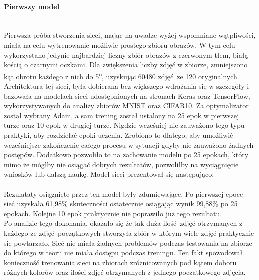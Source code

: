 \paragraph{Pierwszy model} \mbox{}\\
Pierwsza próba stworzenia sieci, mając na uwadze wyżej wspomniane wątpliwości, miała
na celu wytrenowanie możliwie prostego zbioru obrazów. W tym celu wykorzystano jedynie
najbardziej liczny zbiór obrazów z czerwonym tłem, białą kością o czarnymi oczkami. Dla
zwiększenia liczby zdjęć w zbiorze, zmniejszono kąt obrotu każdego z nich do
5\textsuperscript{o}, uzyskując 60480 zdjęć ze 120 oryginalnych.\\
Architektura tej sieci, była dobierana bez większego wdrażania się w szczegóły i
bazowała na modelach sieci udostępnionych na stronach Keras oraz TensorFlow,
wykorzystywanych do analizy zbiorów MNIST oraz CIFAR10. Za optymalizator został wybrany
Adam, a sam trening został ustalony na 25 epok w pierwszej turze oraz 10 epok w drugiej
turze. Nigdzie wcześniej nie zauważono tego typu praktyki, aby rozdzielać epoki uczenia.
Zrobiono to dlatego, aby umożliwić wcześniejsze zakończenie całego procesu w sytuacji
gdyby nie zauważono żadnych postępów. Dodatkowo pozwoliło to na zachowanie modelu
po 25 epokach, który mimo że mógłby nie osiągać dobrych rezultatów, pozwoliłby
na wyciągnięcie wniosków lub dalszą naukę. Model sieci prezentował się następująco:\\\\
Rezulataty osiągnięte przez ten model były zdumiewające. Po pierwszej epoce
sieć uzyskała 61,98\% skuteczności ostatecznie osiągając wynik 99,88\% po 25 epokach.
Kolejne 10 epok praktycznie nie poprawiło już tego rezultatu.\\
Po analizie tego dokonania, okazało się że tak duża ilość zdjęć otrzymanych
z każdego ze zdjęć początkowych stworzyła zbiór w którym wiele zdjęć praktycznie się
powtarzało. Sieć nie miała żadnych problemów podczas testowania na zbiorze
do którego w teorii nie miała dostępu podczas treningu. Ten fakt spowodował konieczność
trenowania sieci na zbiorach zróżnicowanych pod kątem doboru różnych kolorów oraz
ilości zdjęć otrzymanych z jednego poczatkowego zdjęcia.


